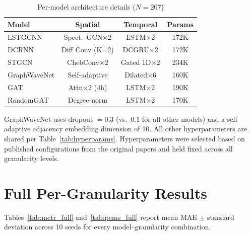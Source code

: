 \documentclass[letterpaper]{article}
\begin{document}
\begin{table}[t]
\small
\centering
\caption{Per-model architecture details ($N = 207$)}
\label{tab:model_params}
\begin{tabular}{lccc}
\toprule
Model & Spatial & Temporal & Params \\
\midrule
LSTGCNN      & Spect.\ GCN$\times$2 & LSTM$\times$2 & 172K \\
DCRNN        & Diff Conv (K=2) & DCGRU$\times$2 & 172K \\
STGCN        & ChebConv$\times$2 & Gated 1D$\times$2 & 234K \\
GraphWaveNet & Self-adaptive & Dilated$\times$6 & 160K \\
GAT          & Attn$\times$2 (4h) & LSTM$\times$2 & 190K \\
RandomGAT    & Degree-norm & LSTM$\times$2 & 170K \\
\bottomrule
\end{tabular}
\end{table}

GraphWaveNet uses dropout $= 0.3$ (vs.\ $0.1$ for all other models) and a self-adaptive adjacency embedding dimension of 10. All other hyperparameters are shared per Table~\ref{tab:hyperparams}. Hyperparameters were selected based on published configurations from the original papers and held fixed across all granularity levels.


\section{Full Per-Granularity Results}
\label{app:full_results}

Tables~\ref{tab:metr_full} and~\ref{tab:pems_full} report mean MAE $\pm$ standard deviation across 10 seeds for every model--granularity combination.
\end{document}
